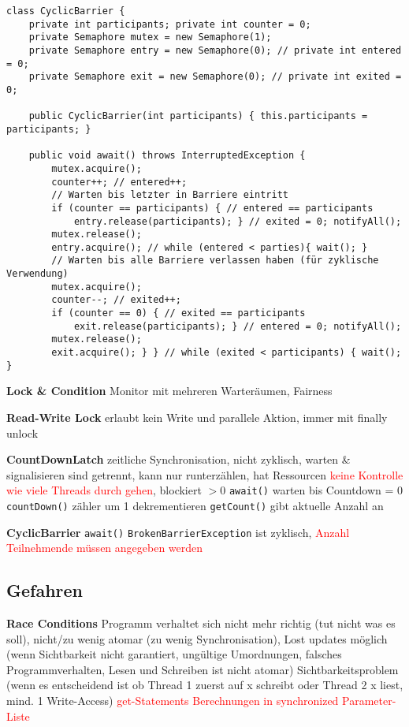 \begin{lstlisting}
class CyclicBarrier {
    private int participants; private int counter = 0;
    private Semaphore mutex = new Semaphore(1);
    private Semaphore entry = new Semaphore(0); // private int entered = 0;
    private Semaphore exit = new Semaphore(0); // private int exited = 0;

    public CyclicBarrier(int participants) { this.participants = participants; }

    public void await() throws InterruptedException {
        mutex.acquire();
        counter++; // entered++;
        // Warten bis letzter in Barriere eintritt
        if (counter == participants) { // entered == participants
            entry.release(participants); } // exited = 0; notifyAll();
        mutex.release();
        entry.acquire(); // while (entered < parties){ wait(); }
        // Warten bis alle Barriere verlassen haben (für zyklische Verwendung)
        mutex.acquire();
        counter--; // exited++;
        if (counter == 0) { // exited == participants
            exit.release(participants); } // entered = 0; notifyAll();
        mutex.release();
        exit.acquire(); } } // while (exited < participants) { wait(); }
\end{lstlisting}

\textbf{Lock \& Condition} Monitor mit mehreren Warteräumen, Fairness

\textbf{Read-Write Lock} erlaubt kein Write und parallele Aktion, immer mit finally unlock

\textbf{CountDownLatch} zeitliche Synchronisation, nicht zyklisch, warten \& signalisieren sind getrennt, kann nur runterzählen, hat Ressourcen \textcolor{red}{keine Kontrolle wie viele Threads durch gehen}, blockiert $> 0$ \lstinline{await()} warten bis Countdown = 0 \lstinline{countDown()} zähler um 1 dekrementieren \lstinline{getCount()} gibt aktuelle Anzahl an

\textbf{CyclicBarrier} \lstinline{await()} \lstinline{BrokenBarrierException} ist zyklisch, \textcolor{red}{Anzahl Teilnehmende müssen angegeben werden}

\subsection{Gefahren}

\textbf{Race Conditions} Programm verhaltet sich nicht mehr richtig (tut nicht was es soll), nicht/zu wenig atomar (zu wenig Synchronisation), Lost updates möglich (wenn Sichtbarkeit nicht garantiert, ungültige Umordnungen, falsches Programmverhalten, Lesen und Schreiben ist nicht atomar) Sichtbarkeitsproblem (wenn es entscheidend ist ob Thread 1 zuerst auf x schreibt oder Thread 2 x liest, mind. 1 Write-Access) \textcolor{red}{get-Statements} \textcolor{red}{Berechnungen in synchronized Parameter-Liste}

